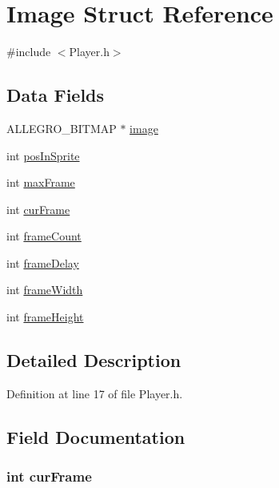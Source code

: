 \hypertarget{struct_image}{\section{Image Struct Reference}
\label{struct_image}
}


{\ttfamily \#include $<$Player.\-h$>$}

\subsection*{Data Fields}
\begin{DoxyCompactItemize}
\item 
A\-L\-L\-E\-G\-R\-O\-\_\-\-B\-I\-T\-M\-A\-P $\ast$ \hyperlink{struct_image_a2e9bc0a29cac926ccbf8e4cd858d2145}{image}
\item 
int \hyperlink{struct_image_aae057d23d1a222c7f7557af8d3795684}{pos\-In\-Sprite}
\item 
int \hyperlink{struct_image_a317d3b63a750c601fa4f8cde6d156c93}{max\-Frame}
\item 
int \hyperlink{struct_image_a96e5c1a8e1994ef921da51a70eddc7d3}{cur\-Frame}
\item 
int \hyperlink{struct_image_abaf7d77bd2fc7eb6125fa605bd645b67}{frame\-Count}
\item 
int \hyperlink{struct_image_a2064d16c49632c5426219fae4734331c}{frame\-Delay}
\item 
int \hyperlink{struct_image_ac995d2487f1e00d19fc05941a9e4e89a}{frame\-Width}
\item 
int \hyperlink{struct_image_ae86b4f83e04bd20a090cd8965b4716ca}{frame\-Height}
\end{DoxyCompactItemize}


\subsection{Detailed Description}


Definition at line 17 of file Player.\-h.



\subsection{Field Documentation}
\hypertarget{struct_image_a96e5c1a8e1994ef921da51a70eddc7d3}{
\subsubsection[{cur\-Frame}]{\setlength{\rightskip}{0pt plus 5cm}int cur\-Frame}}\label{struct_image_a96e5c1a8e1994ef921da51a70eddc7d3}


